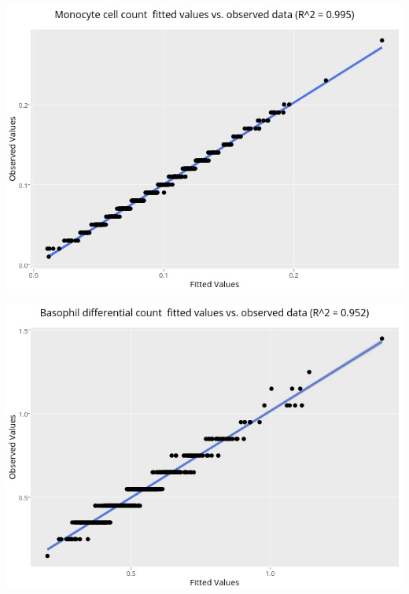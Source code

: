 \documentclass[landscape,a0paper,fontscale=0.285]{baposter} %
\begin{document}
\begin{poster}
{\begin{multicols}{2}
\end{multicols}


\begin{multicols}{2}

\begin{center}
\includegraphics[scale=0.25]{covar4_monocytes}
\end{center}

\begin{center}
\includegraphics[scale=0.25]{covar5_basophils}
\end{center}

\end{multicols}
}


\end{poster}
\end{document}
